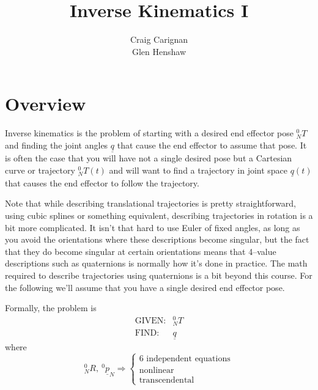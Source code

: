 \documentclass[]{article}
\title{Inverse Kinematics I}
\author{Craig Carignan\\Glen Henshaw}
\begin{document}
\maketitle

\section{Overview}
Inverse kinematics is the problem of starting with a desired end effector pose $^{0}_{N}T$ and finding the joint angles $\underline{q}$ that cause the end effector to assume that pose. It is often the case that you will have not a single desired pose but a Cartesian curve or trajectory $^{0}_{N}T(t)$ and will want to find a trajectory in joint space $\underline{q}(t)$ that causes the end effector to follow the trajectory.

Note that while describing translational trajectories is pretty straightforward, using cubic splines or something equivalent, describing trajectories in rotation is a bit more complicated. It isn't that hard to use Euler of fixed angles, as long as you avoid the orientations where these descriptions become singular, but the fact that they do become singular at certain orientations means that 4--value descriptions such as quaternions is normally how it's done in practice. The math required to describe trajectories using quaternions is a bit beyond this course. For the following we'll assume that you have a single desired end effector pose.

\begin{figure}[h!]
	\centering
\end{figure}

Formally, the problem is
\begin{eqnarray}
	\text{GIVEN:} & ^{0}_{N}T \nonumber\\
	\text{FIND:} & \underline{q} \nonumber
\end{eqnarray}
where
\begin{displaymath}
^{0}_{N}R, \ \!^{0}\underline{p}_{N} \Rightarrow \left\{\begin{array}{l} \text{6 independent equations}\\ \text{nonlinear}\\ \text{transcendental}\end{array}\right.
\end{displaymath}
\end{document}
